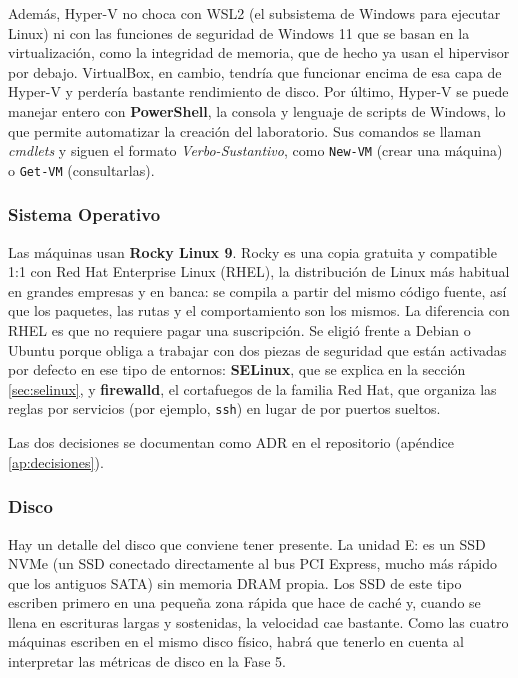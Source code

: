 \documentclass[11pt, a4paper, titlepage]{article}
\newcommand{\cod}[1]{\texttt{#1}}
\begin{document}
Además, Hyper-V no choca con WSL2 (el subsistema de Windows para ejecutar Linux) ni con las funciones de seguridad de Windows 11 que se basan en la virtualización, como la integridad de memoria, que de hecho ya usan el hipervisor por debajo. VirtualBox, en cambio, tendría que funcionar encima de esa capa de Hyper-V y perdería bastante rendimiento de disco. Por último, Hyper-V se puede manejar entero con \textbf{PowerShell}, la consola y lenguaje de scripts de Windows, lo que permite automatizar la creación del laboratorio. Sus comandos se llaman \textit{cmdlets} y siguen el formato \textit{Verbo-Sustantivo}, como \cod{New-VM} (crear una máquina) o \cod{Get-VM} (consultarlas).

\subsubsection{Sistema Operativo}

Las máquinas usan \textbf{Rocky Linux 9}. Rocky es una copia gratuita y compatible 1:1 con Red Hat Enterprise Linux (RHEL), la distribución de Linux más habitual en grandes empresas y en banca: se compila a partir del mismo código fuente, así que los paquetes, las rutas y el comportamiento son los mismos. La diferencia con RHEL es que no requiere pagar una suscripción. Se eligió frente a Debian o Ubuntu porque obliga a trabajar con dos piezas de seguridad que están activadas por defecto en ese tipo de entornos: \textbf{SELinux}, que se explica en la sección \ref{sec:selinux}, y \textbf{firewalld}, el cortafuegos de la familia Red Hat, que organiza las reglas por servicios (por ejemplo, \cod{ssh}) en lugar de por puertos sueltos.

Las dos decisiones se documentan como ADR en el repositorio (apéndice \ref{ap:decisiones}).

\subsubsection{Disco}

Hay un detalle del disco que conviene tener presente. La unidad E: es un SSD NVMe (un SSD conectado directamente al bus PCI Express, mucho más rápido que los antiguos SATA) sin memoria DRAM propia. Los SSD de este tipo escriben primero en una pequeña zona rápida que hace de caché y, cuando se llena en escrituras largas y sostenidas, la velocidad cae bastante. Como las cuatro máquinas escriben en el mismo disco físico, habrá que tenerlo en cuenta al interpretar las métricas de disco en la Fase 5.
\end{document}
